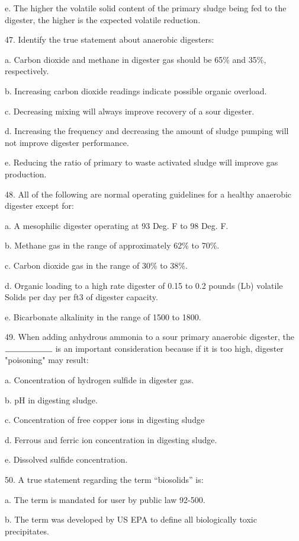 \documentclass{article}
\begin{document}
e. The higher the volatile solid content of the primary sludge being fed to the digester, the higher is the expected volatile reduction. 


47. Identify the true statement about anaerobic digesters: 

a. Carbon dioxide and methane in digester gas should be 65\% and 35\%, respectively. 

b. Increasing carbon dioxide readings indicate possible organic overload. 

c. Decreasing mixing will always improve recovery of a sour digester. 

d. Increasing the frequency and decreasing the amount of sludge pumping will not improve digester performance. 

e. Reducing the ratio of primary to waste activated sludge will improve gas production. 


48. All of the following are normal operating guidelines for a healthy anaerobic digester except for: 

a. A mesophilic digester operating at 93 Deg. F to 98 Deg. F. 

b. Methane gas in the range of approximately 62\% to 70\%. 

c. Carbon dioxide gas in the range of 30\% to 38\%. 

d. Organic loading to a high rate digester of 0.15 to 0.2 pounds (Lb) volatile Solids per day per ft3 of digester capacity. 

e. Bicarbonate alkalinity in the range of 1500 to 1800. 


49. When adding anhydrous ammonia to a sour primary anaerobic digester, the $\rule{2cm}{0.15mm}$ is an important consideration because if it is too high, digester "poisoning" may result: 

a. Concentration of hydrogen sulfide in digester gas. 

b. pH in digesting sludge. 

c. Concentration of free copper ions in digesting sludge 

d. Ferrous and ferric ion concentration in digesting sludge. 

e. Dissolved sulfide concentration. 


50. A true statement regarding the term “biosolids” is: 

a. The term is mandated for user by public law 92-500. 

b. The term was developed by US EPA to define all biologically toxic precipitates. 
\end{document}
